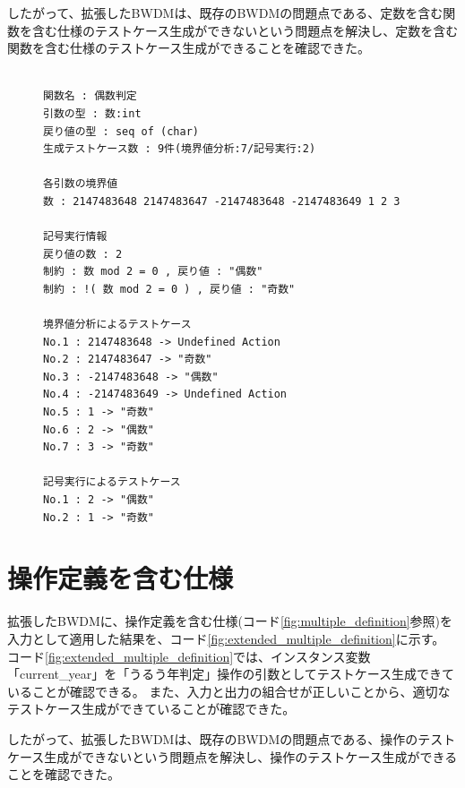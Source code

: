 \documentclass[uplatex, report, a4j, 10pt]{jsbook}
\begin{document}
したがって、拡張したBWDMは、既存のBWDMの問題点である、定数を含む関数を含む仕様のテストケース生成ができないという問題点を解決し、定数を含む関数を含む仕様のテストケース生成ができることを確認できた。

\lstset{language=}
\begin{figure}[tp]
  \begin{lstlisting}[caption=拡張したBWDMに定数を含む関数を含む仕様(コード\ref{fig:value_definition})を適用した際の出力,label=fig:extended_value_definition_result]

関数名 : 偶数判定
引数の型 : 数:int 
戻り値の型 : seq of (char)
生成テストケース数 : 9件(境界値分析:7/記号実行:2)

各引数の境界値
数 : 2147483648 2147483647 -2147483648 -2147483649 1 2 3 

記号実行情報
戻り値の数 : 2
制約 : 数 mod 2 = 0 , 戻り値 : "偶数"
制約 : !( 数 mod 2 = 0 ) , 戻り値 : "奇数"

境界値分析によるテストケース
No.1 : 2147483648 -> Undefined Action
No.2 : 2147483647 -> "奇数"
No.3 : -2147483648 -> "偶数"
No.4 : -2147483649 -> Undefined Action
No.5 : 1 -> "奇数"
No.6 : 2 -> "偶数"
No.7 : 3 -> "奇数"

記号実行によるテストケース
No.1 : 2 -> "偶数"
No.2 : 1 -> "奇数"

\end{lstlisting}
\end{figure}

\section{操作定義を含む仕様}\label{sec:tekiyou_operation}
拡張したBWDMに、操作定義を含む仕様(コード\ref{fig:multiple_definition}参照)を入力として適用した結果を、コード\ref{fig:extended_multiple_definition}に示す。
コード\ref{fig:extended_multiple_definition}では、インスタンス変数「current\_year」を「うるう年判定」操作の引数としてテストケース生成できていることが確認できる。
また、入力と出力の組合せが正しいことから、適切なテストケース生成ができていることが確認できた。

したがって、拡張したBWDMは、既存のBWDMの問題点である、操作のテストケース生成ができないという問題点を解決し、操作のテストケース生成ができることを確認できた。
\end{document}
